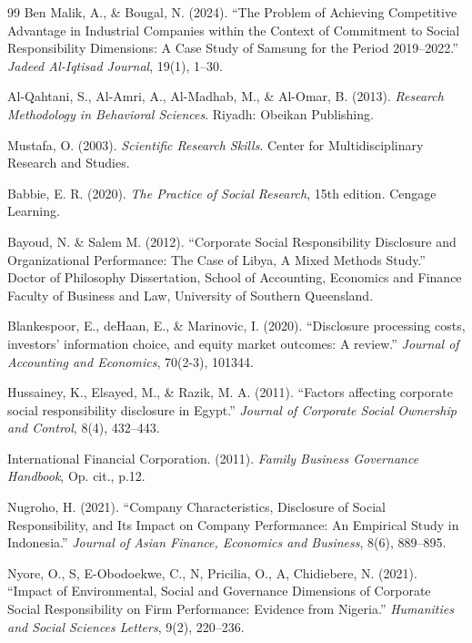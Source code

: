\documentclass[10pt]{NSP1}
\begin{document}
\begin{thebibliography}{99}
		Ben Malik, A., \& Bougal, N. (2024). ``The Problem of Achieving Competitive Advantage in Industrial Companies within the Context of Commitment to Social Responsibility Dimensions: A Case Study of Samsung for the Period 2019–2022.'' \emph{Jadeed Al-Iqtisad Journal}, 19(1), 1--30.
		
		Al-Qahtani, S., Al-Amri, A., Al-Madhab, M., \& Al-Omar, B. (2013). \emph{Research Methodology in Behavioral Sciences}. Riyadh: Obeikan Publishing.
		
		Mustafa, O. (2003). \emph{Scientific Research Skills}. Center for Multidisciplinary Research and Studies.
		
		Babbie, E. R. (2020). \emph{The Practice of Social Research}, 15th edition. Cengage Learning.
		
		Bayoud, N. \& Salem M. (2012). ``Corporate Social Responsibility Disclosure and Organizational Performance: The Case of Libya, A Mixed Methods Study.'' Doctor of Philosophy Dissertation, School of Accounting, Economics and Finance Faculty of Business and Law, University of Southern Queensland.
		
		Blankespoor, E., deHaan, E., \& Marinovic, I. (2020). ``Disclosure processing costs, investors' information choice, and equity market outcomes: A review.'' \emph{Journal of Accounting and Economics}, 70(2-3), 101344.
		
		Hussainey, K., Elsayed, M., \& Razik, M. A. (2011). ``Factors affecting corporate social responsibility disclosure in Egypt.'' \emph{Journal of Corporate Social Ownership and Control}, 8(4), 432--443.
		
		International Financial Corporation. (2011). \emph{Family Business Governance Handbook}, Op. cit., p.12.
		
		Nugroho, H. (2021). ``Company Characteristics, Disclosure of Social Responsibility, and Its Impact on Company Performance: An Empirical Study in Indonesia.'' \emph{Journal of Asian Finance, Economics and Business}, 8(6), 889--895.
		
		Nyore, O., S, E-Obodoekwe, C., N, Pricilia, O., A, Chidiebere, N. (2021). ``Impact of Environmental, Social and Governance Dimensions of Corporate Social Responsibility on Firm Performance: Evidence from Nigeria.'' \emph{Humanities and Social Sciences Letters}, 9(2), 220--236.
		
	\end{thebibliography}
	
\end{document}
